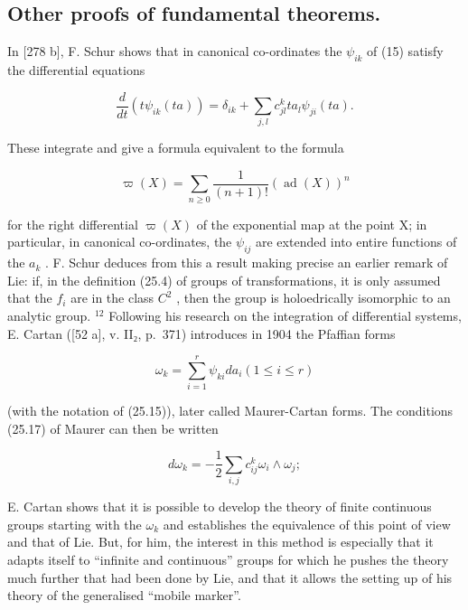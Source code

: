 \subsection*{Other proofs of fundamental theorems.}
{}

In {[}278 b{]}, F. Schur shows that in canonical co-ordinates the \(\psi_{ik}\) of (15) satisfy the differential equations

\[
\frac {d}{d t} (t \psi_ {i k} (t a)) = \delta_ {i k} + \sum_ {j, l} c _ {j l} ^ {k} t a _ {l} \psi_ {j i} (t a).\tag{25.23}
\]

These integrate and give a formula equivalent to the formula

\[
\varpi (X) = \sum_ {n \geq 0} \frac {1}{(n + 1) !} (\operatorname{ad} (X)) ^ {n}\tag{25.24}
\]

for the right differential \(\varpi(X)\) of the exponential map at the point X; in particular, in canonical co-ordinates, the \(\psi_{ij}\) are extended into entire functions of the \(a_{k}\) . F. Schur deduces from this a result making precise an earlier remark of Lie: if, in the definition (25.4) of groups of transformations, it is only assumed that the \(f_{i}\) are in the class \(C^{2}\) , then the group is holoedrically isomorphic to an analytic group. \(^{12}\) Following his research on the integration of differential systems, E. Cartan ({[}52 a{]}, v. II₂, p.~371) introduces in 1904 the Pfaffian forms

\[
\omega_ {k} = \sum_ {i = 1} ^ {r} \psi_ {k i} d a _ {i} (1 \leq i \leq r)\tag{25.25}
\]

(with the notation of (25.15)), later called Maurer-Cartan forms. The conditions (25.17) of Maurer can then be written

\[
d \omega_ {k} = - \frac {1}{2} \sum_ {i, j} c _ {i j} ^ {k} \omega_ {i} \wedge \omega_ {j};
\]

E. Cartan shows that it is possible to develop the theory of finite continuous groups starting with the \(\omega_{k}\) and establishes the equivalence of this point of view and that of Lie. But, for him, the interest in this method is especially that it adapts itself to ``infinite and continuous'' groups for which he pushes the theory much further that had been done by Lie, and that it allows the setting up of his theory of the generalised ``mobile marker''.

